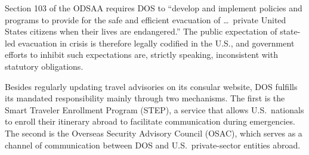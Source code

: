 \documentclass[12pt]{article}
\begin{document}
Section 103 of the ODSAA requires DOS to ``develop and implement policies and programs to provide for the safe and efficient evacuation of \ldots\ private United States citizens when their lives are endangered.'' The public expectation of state-led evacuation in crisis is therefore legally codified in the U.S., and government efforts to inhibit such expectations are, strictly speaking, inconsistent with statutory obligations.

Besides regularly updating travel advisories on its consular website, DOS fulfills its mandated responsibility mainly through two mechanisms. The first is the Smart Traveler Enrollment Program (STEP), a service that allows U.S.\ nationals to enroll their itinerary abroad to facilitate communication during emergencies. The second is the Overseas Security Advisory Council (OSAC), which serves as a channel of communication between DOS and U.S.\ private-sector entities abroad.

\newpage


\end{document}
